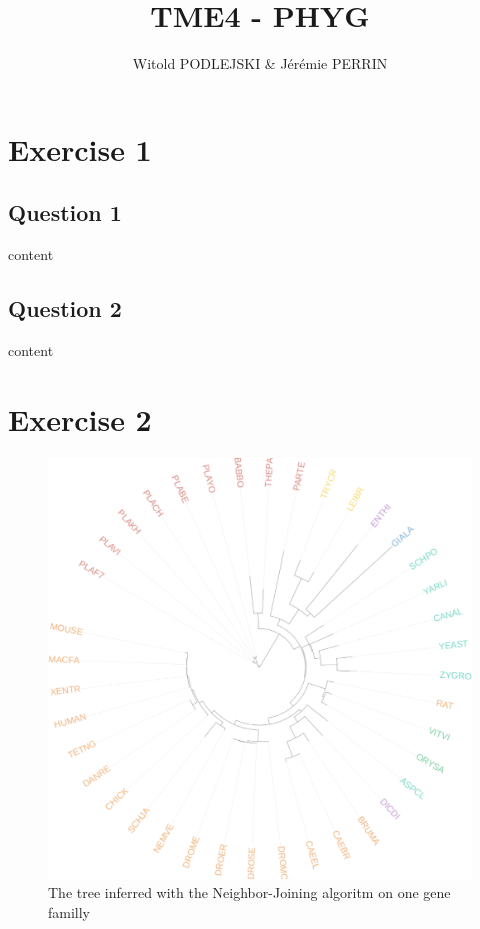 \documentclass[]{article}
\title{TME4 - PHYG}
\author{Witold PODLEJSKI \& Jérémie PERRIN}
\theoremstyle{definition}
\begin{document}
\maketitle

\section{Exercise 1}
\subsection{Question 1}
content
\subsection{Question 2}
content
\section{Exercise 2}

\begin{figure}[H]
	\includegraphics*[width = \linewidth]{image/Nj_ex2.pdf}
	\caption{ The tree inferred with the Neighbor-Joining algoritm on one gene familly }
\end{figure}
\end{document}
